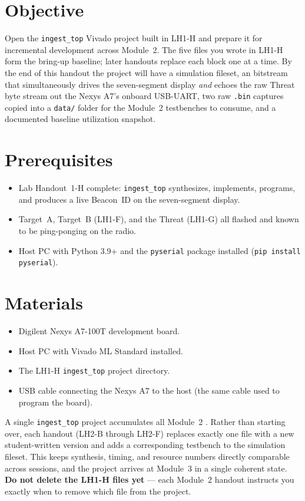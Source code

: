 \documentclass[11pt,letterpaper]{article}
\begin{document}

\section{Objective}
Open the \texttt{ingest\_top} Vivado project built in LH1-H and prepare it for incremental \RTL{} development across Module~2. The five \VHDL{} files you wrote in LH1-H form the bring-up baseline; later handouts replace each block one at a time. By the end of this handout the project will have a simulation fileset, an \FPGA{} bitstream that simultaneously drives the seven-segment display \emph{and} echoes the raw Threat byte stream out the Nexys A7's onboard USB-UART, two raw \texttt{.bin} captures copied into a \texttt{data/} folder for the Module~2 testbenches to consume, and a documented baseline utilization snapshot.

\section{Prerequisites}
\begin{itemize}[leftmargin=2em]
	\item Lab Handout~1-H complete: \texttt{ingest\_top} synthesizes, implements, programs, and produces a live Beacon~ID on the seven-segment display.
	\item Target~A, Target~B (LH1-F), and the Threat (LH1-G) all flashed and known to be ping-ponging on the radio.
	\item Host PC with Python 3.9+ and the \texttt{pyserial} package installed (\texttt{pip install pyserial}).
\end{itemize}

\section{Materials}
\begin{itemize}[leftmargin=2em]
	\item Digilent Nexys A7-100T development board.
	\item Host PC with Vivado ML Standard installed.
	\item The LH1-H \texttt{ingest\_top} project directory.
	\item USB cable connecting the Nexys A7 to the host (the same cable used to program the board).
\end{itemize}

\begin{tcolorbox}[infobox={Module~2 development model}]
	A single \texttt{ingest\_top} project accumulates all Module~2 \RTL{}. Rather than starting over, each handout (LH2-B through LH2-F) replaces exactly one \VHDL{} file with a new student-written version and adds a corresponding testbench to the simulation fileset. This keeps synthesis, timing, and resource numbers directly comparable across sessions, and the project arrives at Module~3 in a single coherent state. \textbf{Do not delete the LH1-H files yet} --- each Module~2 handout instructs you exactly when to remove which file from the project.
\end{tcolorbox}
\end{document}
